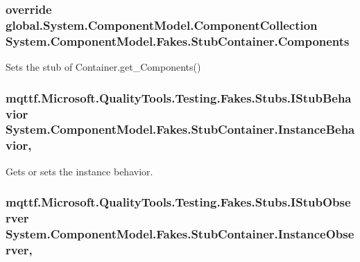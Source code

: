 \hypertarget{class_system_1_1_component_model_1_1_fakes_1_1_stub_container_a54d15e0b28f58532103ff25c3832a8c5}{
\subsubsection[{Components}]{\setlength{\rightskip}{0pt plus 5cm}override global.\-System.\-Component\-Model.\-Component\-Collection System.\-Component\-Model.\-Fakes.\-Stub\-Container.\-Components\hspace{0.3cm}{\ttfamily [get]}}}\label{class_system_1_1_component_model_1_1_fakes_1_1_stub_container_a54d15e0b28f58532103ff25c3832a8c5}


Sets the stub of Container.\-get\-\_\-\-Components()

\hypertarget{class_system_1_1_component_model_1_1_fakes_1_1_stub_container_ac36184c8146e0c7ba223cbdd13912f45}{
\subsubsection[{Instance\-Behavior}]{\setlength{\rightskip}{0pt plus 5cm}mqttf.\-Microsoft.\-Quality\-Tools.\-Testing.\-Fakes.\-Stubs.\-I\-Stub\-Behavior System.\-Component\-Model.\-Fakes.\-Stub\-Container.\-Instance\-Behavior\hspace{0.3cm}{\ttfamily [get]}, {\ttfamily [set]}}}\label{class_system_1_1_component_model_1_1_fakes_1_1_stub_container_ac36184c8146e0c7ba223cbdd13912f45}


Gets or sets the instance behavior.

\hypertarget{class_system_1_1_component_model_1_1_fakes_1_1_stub_container_a8fac830a6a1b1565888da1491e9cf997}{
\subsubsection[{Instance\-Observer}]{\setlength{\rightskip}{0pt plus 5cm}mqttf.\-Microsoft.\-Quality\-Tools.\-Testing.\-Fakes.\-Stubs.\-I\-Stub\-Observer System.\-Component\-Model.\-Fakes.\-Stub\-Container.\-Instance\-Observer\hspace{0.3cm}{\ttfamily [get]}, {\ttfamily [set]}}}\label{class_system_1_1_component_model_1_1_fakes_1_1_stub_container_a8fac830a6a1b1565888da1491e9cf997}


